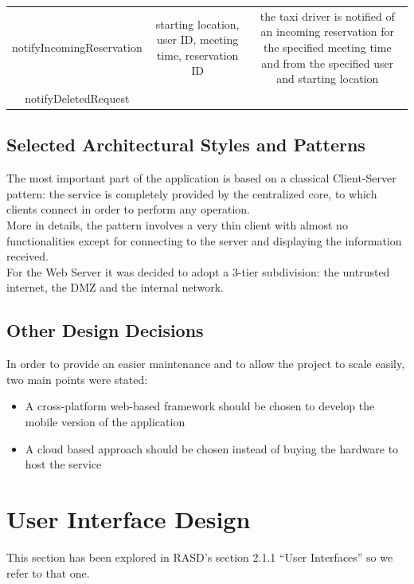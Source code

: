 \documentclass{article}
\begin{document}
\begin{itemize}
\begin{itemize}
\begin{adjustbox}{width=1.2\textwidth}
\begin{tabular}{*{3}{c}}
							notifyIncomingReservation & starting location, user ID, meeting time, reservation ID & the taxi driver is notified of an incoming reservation for the specified meeting time and from the specified user and starting location \\
							notifyDeletedRequest %
							\bottomrule
						\end{tabular}
					\end{adjustbox}	
			\end{itemize}		
	\end{itemize}
	\subsection{Selected Architectural Styles and Patterns}
	The most important part of the application is based on a classical Client-Server pattern: the service is completely provided by the centralized core, to which clients connect in order to perform any operation.\\
	More in details, the pattern involves a very thin client with almost no functionalities except for connecting to the server and displaying the information received.\\
	For the Web Server it was decided to adopt a 3-tier subdivision: the untrusted internet, the DMZ and the internal network. %
	\subsection{Other Design Decisions}
	In order to provide an easier maintenance and to allow the project to scale easily, two main points were stated: 
	\begin{itemize}
		\item A cross-platform web-based framework should be chosen to develop the mobile version of the application 
		\item A cloud based approach should be chosen instead of buying the hardware to host the service
	\end{itemize}

	\section{User Interface Design}
	This section has been explored in RASD's section 2.1.1 ``User Interfaces'' so we refer to that one.
\end{document}
